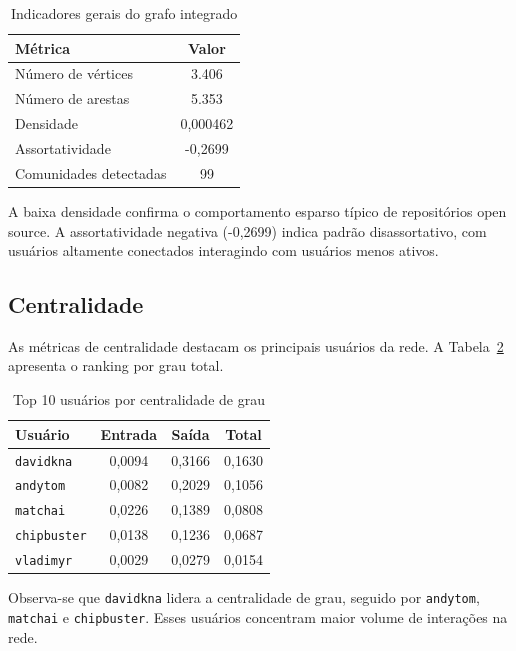 \documentclass[12pt]{article}
\begin{document}
\begin{table}[H]
\centering
\caption{Indicadores gerais do grafo integrado}
\label{tab:resultados_gerais}
\begin{tabular}{|l|c|}
\hline
\textbf{Métrica} & \textbf{Valor} \\ \hline
Número de vértices & 3.406 \\ \hline
Número de arestas & 5.353 \\ \hline
Densidade & 0,000462 \\ \hline
Assortatividade & -0,2699 \\ \hline
Comunidades detectadas & 99 \\ \hline
\end{tabular}
\end{table}

A baixa densidade confirma o comportamento esparso típico de repositórios open source. A assortatividade negativa (-0,2699) indica padrão disassortativo, com usuários altamente conectados interagindo com usuários menos ativos.

\subsection{Centralidade}

As métricas de centralidade destacam os principais usuários da rede. A Tabela~\ref{tab:degree_centrality} apresenta o ranking por grau total.

\begin{table}[H]
\centering
\caption{Top 10 usuários por centralidade de grau}
\label{tab:degree_centrality}
\begin{tabular}{|l|c|c|c|}
\hline
\textbf{Usuário} & \textbf{Entrada} & \textbf{Saída} & \textbf{Total} \\ \hline
\texttt{davidkna} & 0,0094 & 0,3166 & 0,1630 \\ \hline
\texttt{andytom} & 0,0082 & 0,2029 & 0,1056 \\ \hline
\texttt{matchai} & 0,0226 & 0,1389 & 0,0808 \\ \hline
\texttt{chipbuster} & 0,0138 & 0,1236 & 0,0687 \\ \hline
\texttt{vladimyr} & 0,0029 & 0,0279 & 0,0154 \\ \hline
\end{tabular}
\end{table}

Observa-se que \texttt{davidkna} lidera a centralidade de grau, seguido por \texttt{andytom}, \texttt{matchai} e \texttt{chipbuster}. Esses usuários concentram maior volume de interações na rede.
\end{document}
